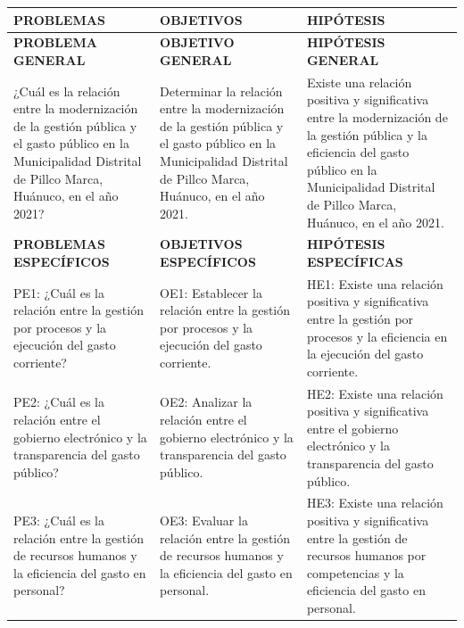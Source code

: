 \documentclass[
  man,
  floatsintext,
  longtable,
  a4paper,
  nolmodern,
  notxfonts,
  notimes,
  12pt,
  colorlinks=true,linkcolor=blue,citecolor=blue,urlcolor=blue]{apa7}
\newcounter{none} %
\begin{document}
{\def\LTcaptype{none} %
\begin{longtable}[]{@{}
  >{\raggedright\arraybackslash}p{}
  >{\raggedright\arraybackslash}p{}
  >{\raggedright\arraybackslash}p{}@{}}
\toprule\noalign{}
\begin{minipage}[b]{\linewidth}\raggedright
PROBLEMAS
\end{minipage} & \begin{minipage}[b]{\linewidth}\raggedright
OBJETIVOS
\end{minipage} & \begin{minipage}[b]{\linewidth}\raggedright
HIPÓTESIS
\end{minipage} \\
\midrule\noalign{}
\endhead
\bottomrule\noalign{}
\endlastfoot
\textbf{PROBLEMA GENERAL} & \textbf{OBJETIVO GENERAL} &
\textbf{HIPÓTESIS GENERAL} \\
¿Cuál es la relación entre la modernización de la gestión pública y el
gasto público en la Municipalidad Distrital de Pillco Marca, Huánuco, en
el año 2021? & Determinar la relación entre la modernización de la
gestión pública y el gasto público en la Municipalidad Distrital de
Pillco Marca, Huánuco, en el año 2021. & Existe una relación positiva y
significativa entre la modernización de la gestión pública y la
eficiencia del gasto público en la Municipalidad Distrital de Pillco
Marca, Huánuco, en el año 2021. \\
\textbf{PROBLEMAS ESPECÍFICOS} & \textbf{OBJETIVOS ESPECÍFICOS} &
\textbf{HIPÓTESIS ESPECÍFICAS} \\
PE1: ¿Cuál es la relación entre la gestión por procesos y la ejecución
del gasto corriente? & OE1: Establecer la relación entre la gestión por
procesos y la ejecución del gasto corriente. & HE1: Existe una relación
positiva y significativa entre la gestión por procesos y la eficiencia
en la ejecución del gasto corriente. \\
PE2: ¿Cuál es la relación entre el gobierno electrónico y la
transparencia del gasto público? & OE2: Analizar la relación entre el
gobierno electrónico y la transparencia del gasto público. & HE2: Existe
una relación positiva y significativa entre el gobierno electrónico y la
transparencia del gasto público. \\
PE3: ¿Cuál es la relación entre la gestión de recursos humanos y la
eficiencia del gasto en personal? & OE3: Evaluar la relación entre la
gestión de recursos humanos y la eficiencia del gasto en personal. &
HE3: Existe una relación positiva y significativa entre la gestión de
recursos humanos por competencias y la eficiencia del gasto en
personal. \\
\end{longtable}
}
\end{document}
